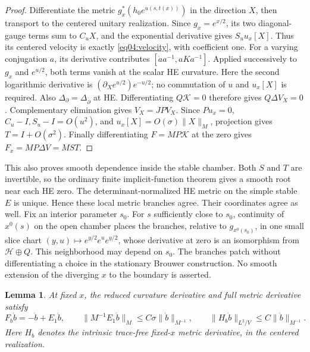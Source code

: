 \documentclass[11pt]{amsart}
\newtheorem{lemma}[theorem]{Lemma}
\theoremstyle{definition}
\theoremstyle{remark}
\newcommand{\HH}{\mathcal H}
\newcommand{\cK}{\mathcal K}
\newcommand{\db}{\bar\partial}
\begin{document}
\begin{proof}
Differentiate the metric
\(g_x^*(h_0e^{u(s,t(x))})\) in the direction \(X\), then transport
to the centered unitary realization. Since \(g_x=e^{x/2}\), its
two diagonal-gauge terms sum to \(C_uX\), and the exponential
derivative gives \(S_uu_x[X]\). Thus its centered velocity is
exactly \eqref{eq04:velocity}, with coefficient one.
For a varying conjugation \(a\), its derivative contributes
\([\dot a a^{-1},aKa^{-1}]\). Applied successively to \(g_x\)
and \(e^{u/2}\), both terms vanish at the scalar HE curvature.
Here the second logarithmic derivative is
\((\partial_Xe^{u/2})e^{-u/2}\); no commutation of \(u\) and
\(u_x[X]\) is required. Also \(\Delta_\partial=\Delta_{\db}\)
at HE. Differentiating \(Q\cK=0\) therefore gives
\(Q\Delta V_X=0\). Complementary elimination gives \(V_X=JPV_X\).
Since \(Pu_x=0\), \(C_u-I,S_u-I=O(u^2)\), and
\(u_x[X]=O(\sigma)\|X\|_M\), projection gives
\(T=I+O(\sigma^2)\). Finally differentiating \(F=MP\cK\)
at the zero gives \(F_x=MP\Delta V=MST\).
\end{proof}

This also proves smooth dependence inside the stable chamber.
Both \(S\) and \(T\) are invertible, so the ordinary finite
implicit-function theorem gives a smooth root near each HE zero.
The determinant-normalized HE metric on the simple stable \(E\)
is unique. Hence these local metric branches agree. Their coordinates
agree as well. Fix an interior parameter \(s_0\). For \(s\)
sufficiently close to \(s_0\), continuity of \(x^0(s)\) on the
open chamber places the branches, relative to
\(g_{x^0(s_0)}\), in one small slice chart
\((y,u)\mapsto e^{y/2}e^ue^{y/2}\), whose derivative at zero is
an isomorphism from \(\HH\oplus Q\). This neighborhood may
depend on \(s_0\). The branches patch without
differentiating a choice in the stationary Brouwer construction.
No smooth extension of the diverging \(x\) to the boundary is asserted.

\begin{lemma}\label{lem04:background}
At fixed \(x\), the reduced curvature derivative and full metric
derivative satisfy
\begin{equation}\label{eq04:background}
 F_b\dot b=-\dot b+E_1\dot b,
 \qquad \|M^{-1}E_1\dot b\|_M\le C\sigma\|\dot b\|_{M^{-1}},
 \qquad \|H_b\dot b\|_{L^2/V}\le C\|\dot b\|_{M^{-1}}.
\end{equation}
Here \(H_b\) denotes the intrinsic trace-free fixed-\(x\) metric
derivative, in the centered realization.
\end{lemma}
\end{document}
